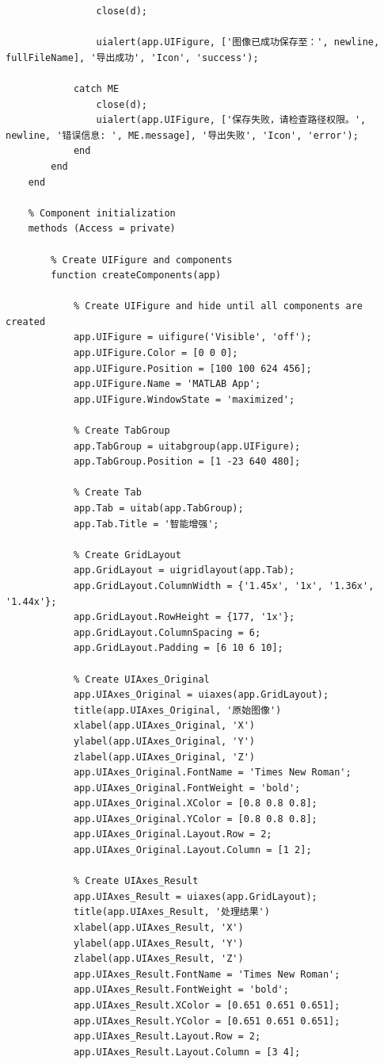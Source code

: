 \documentclass[UTF8, a4paper, 11pt]{ctexart}
\begin{document}
\begin{lstlisting}
                close(d);
               
                uialert(app.UIFigure, ['图像已成功保存至：', newline, fullFileName], '导出成功', 'Icon', 'success');
                
            catch ME
                close(d);
                uialert(app.UIFigure, ['保存失败，请检查路径权限。', newline, '错误信息: ', ME.message], '导出失败', 'Icon', 'error');
            end
        end
    end

    % Component initialization
    methods (Access = private)

        % Create UIFigure and components
        function createComponents(app)

            % Create UIFigure and hide until all components are created
            app.UIFigure = uifigure('Visible', 'off');
            app.UIFigure.Color = [0 0 0];
            app.UIFigure.Position = [100 100 624 456];
            app.UIFigure.Name = 'MATLAB App';
            app.UIFigure.WindowState = 'maximized';

            % Create TabGroup
            app.TabGroup = uitabgroup(app.UIFigure);
            app.TabGroup.Position = [1 -23 640 480];

            % Create Tab
            app.Tab = uitab(app.TabGroup);
            app.Tab.Title = '智能增强';

            % Create GridLayout
            app.GridLayout = uigridlayout(app.Tab);
            app.GridLayout.ColumnWidth = {'1.45x', '1x', '1.36x', '1.44x'};
            app.GridLayout.RowHeight = {177, '1x'};
            app.GridLayout.ColumnSpacing = 6;
            app.GridLayout.Padding = [6 10 6 10];

            % Create UIAxes_Original
            app.UIAxes_Original = uiaxes(app.GridLayout);
            title(app.UIAxes_Original, '原始图像')
            xlabel(app.UIAxes_Original, 'X')
            ylabel(app.UIAxes_Original, 'Y')
            zlabel(app.UIAxes_Original, 'Z')
            app.UIAxes_Original.FontName = 'Times New Roman';
            app.UIAxes_Original.FontWeight = 'bold';
            app.UIAxes_Original.XColor = [0.8 0.8 0.8];
            app.UIAxes_Original.YColor = [0.8 0.8 0.8];
            app.UIAxes_Original.Layout.Row = 2;
            app.UIAxes_Original.Layout.Column = [1 2];

            % Create UIAxes_Result
            app.UIAxes_Result = uiaxes(app.GridLayout);
            title(app.UIAxes_Result, '处理结果')
            xlabel(app.UIAxes_Result, 'X')
            ylabel(app.UIAxes_Result, 'Y')
            zlabel(app.UIAxes_Result, 'Z')
            app.UIAxes_Result.FontName = 'Times New Roman';
            app.UIAxes_Result.FontWeight = 'bold';
            app.UIAxes_Result.XColor = [0.651 0.651 0.651];
            app.UIAxes_Result.YColor = [0.651 0.651 0.651];
            app.UIAxes_Result.Layout.Row = 2;
            app.UIAxes_Result.Layout.Column = [3 4];


\end{lstlisting}
\end{document}
